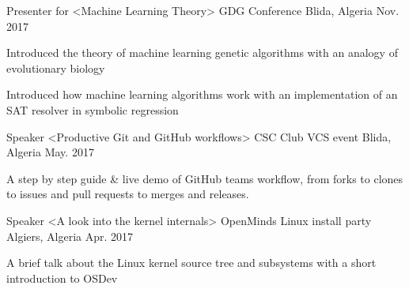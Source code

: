 

\begin{cventries}

  \cventry
    {Presenter for <Machine Learning Theory>} %
    {GDG Conference} %
    {Blida, Algeria} %
    {Nov. 2017} %
    {
      \begin{cvitems} %
        \item {Introduced the theory of machine learning genetic algorithms with an analogy of evolutionary biology}
        \item {Introduced how machine learning algorithms work with an implementation of an SAT resolver in symbolic regression}
      \end{cvitems}
    }

  \cventry
    {Speaker <Productive Git and GitHub workflows>} %
    {CSC Club VCS event} %
    {Blida, Algeria} %
    {May. 2017} %
    {
      \begin{cvitems} %
        \item {A step by step guide \& live demo of GitHub teams workflow, from forks to clones to issues and pull requests to merges and releases.}
      \end{cvitems}
    }

  \cventry
    {Speaker <A look into the kernel internals>} %
    {OpenMinds Linux install party} %
    {Algiers, Algeria} %
    {Apr. 2017} %
    {
      \begin{cvitems} %
        \item {A brief talk about the Linux kernel source tree and subsystems with a short introduction to OSDev}
      \end{cvitems}
    }

\end{cventries}
